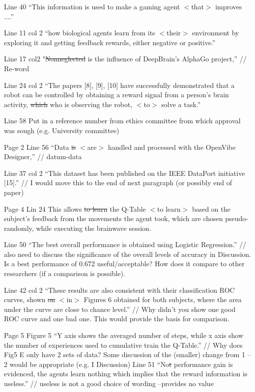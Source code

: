 \documentclass[journal,onecolumn,12pt]{IEEEtran}
\begin{document}
Line 40 “This information is used to make a gaming agent $<$that$>$ improves ....”


Line 11 col 2 “how biological agents learn from its $<$their$>$ environment by exploring it and getting feedback rewards, either negative or positive.”


Line 17 col2 "\sout{Nonneglected} is the influence of DeepBrain’s AlphaGo project,” // Re-word


Line 24 col 2 “The papers [8], [9], [10] have successfully demonstrated that a robot can be controlled by obtaining a reward signal from a person’s brain activity, \sout{which} who is observing the robot, $<$to$>$ solve a task.”


Line 58 Put in a reference number from ethics committee from which approval was sough (e.g. University committee)


Page 2
Line 56 “Data \sout{is} $<$are$>$ handled and processed with the OpenVibe Designer,” // datum-data


Line 37 col 2 “This dataset has been published on the IEEE DataPort initiative [15].” // I would move this to the end of next paragraph (or possibly end of paper)


Page 4
Lin 24 This allows \sout{to learn} the Q-Table $<$to learn$>$ based on the subject’s feedback from the movements the agent
took, which are chosen pseudo-randomly, while executing the brainwave session.


Line 50 “The best overall performance is obtained using Logistic Regression.” // also need to discuss the significance of the overall levels of accuracy in Discussion. Is a best performance of 0.672 useful/acceptable? How does it compare to other researchers (if a comparison is possible).


Line 42 col 2 “These results are also consistent with their classification ROC curves, shown \sout{on} $<$in$>$ Figures 6 obtained for both subjects, where the area under the curve are close to chance level.” // Why didn’t you show one good ROC curve and one bad one. This would provide the basis for comparison.


Page 5
Figure 5 “Y axis shows the averaged number of steps, while x axis show the number of
experiences used to cumulative train the Q-Table.”
// Why does Fig5 E only have 2 sets of data? Some discussion of the (smaller) change from 1 – 2 would be appropriate (e.g. I Discussion)
Line 51 “No\sout{t} performance gain is evidenced, the agents learn nothing which implies that the reward information is useless.” // useless is not a good choice of wording –provides no value
\end{document}
